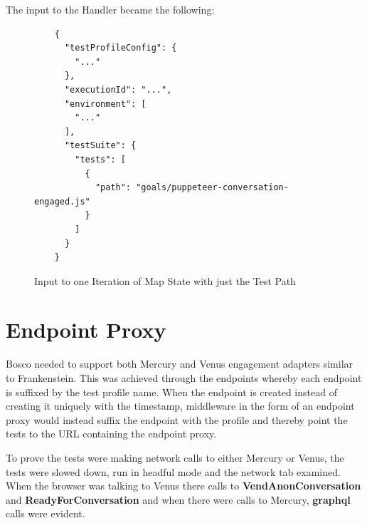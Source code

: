 \documentclass[12pt,a4paper,titlepage]{report}
\begin{document}
The input to the Handler became the following:

\begin{figure}[ht]
 \begin{tcolorbox}
  \begin{verbatim}
    {
      "testProfileConfig": {
        "..."
      },
      "executionId": "...",
      "environment": [
        "..."
      ],
      "testSuite": {
        "tests": [
          {
            "path": "goals/puppeteer-conversation-engaged.js"
          }
        ]
      }
    }
\end{verbatim}
 \end{tcolorbox}
 \caption{Input to one Iteration of Map State with just the Test Path}
\end{figure}

\section{Endpoint Proxy}

Bosco needed to support both Mercury and Venus engagement adapters similar to Frankenstein. This was achieved through the endpoints whereby 
each endpoint is suffixed by the test profile name. When the endpoint is created instead of creating it uniquely with the timestamp, middleware 
in the form of an endpoint proxy would instead suffix the endpoint with the profile and thereby point the tests to the URL 
containing the endpoint proxy. 

To prove the tests were making network calls to either Mercury or Venus, the tests were slowed down, run in headful mode and 
the network tab examined. When the browser was talking to Venus there calls to \textbf{VendAnonConversation} and \textbf{ReadyForConversation} and when there were calls to Mercury, \textbf{graphql} calls were evident.
\end{document}

